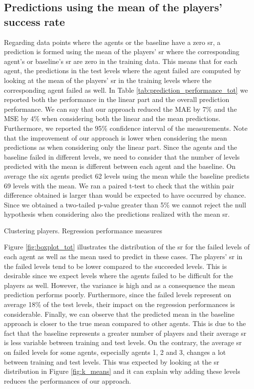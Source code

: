 \subsection*{Predictions using the mean of the players’ success rate}
Regarding data points where the agents or the baseline have a zero \acs{sr}, a prediction is formed using the mean of the players' \acs{sr} where the corresponding agent's or baseline's \acs{sr} are zero in the training data. This means that for each agent, the predictions in the test levels where the agent failed are computed by looking at the mean of the players' \acs{sr} in the training levels where the corresponding agent failed as well. In Table \ref{tab:prediction_performance_tot} we reported both the performance in the linear part and the overall prediction performance. We can say that our approach reduced the MAE by 7\% and the MSE by 4\% when considering both the linear and the mean predictions. Furthermore, we reported the 95\% confidence interval of the measurements. Note that the improvement of our approach is lower when considering the mean predictions as when considering only the linear part.
Since the agents and the baseline failed in different levels, we need to consider that the number of levels predicted with the mean is different between each agent and the baseline. On average the six agents predict 62 levels using the mean while the baseline predicts 69 levels with the mean.
We ran a paired t-test to check that the within pair difference obtained is larger than would be expected to have occurred by chance. Since we obtained a two-tailed p-value greater than 5\% we cannot reject the null hypothesis when considering also the predictions realized with the mean \acs{sr}.
\begin{table}[h!]
    \centering
    \small
    \caption{Clustering players. Regression performance measures} 
    
    \label{tab:prediction_performance_tot}
\end{table} 

Figure \ref{fig:boxplot_tot} illustrates the distribution of the \acs{sr} for the failed levels of each agent as well as the mean used to predict in these cases. The players' \acs{sr} in the failed levels tend to be lower compared to the succeeded levels. This is desirable since we expect levels where the agents failed to be difficult for the players as well. However, the variance is high and as a consequence the mean prediction performs poorly. Furthermore, since the failed levels represent on average 18\% of the test levels, their impact on the regression performances is considerable. Finally, we can observe that the predicted mean in the baseline approach is closer to the true mean compared to other agents. This is due to the fact that the baseline represents a greater number of players and their average \acs{sr} is less variable between training and test levels. On the contrary, the average \acs{sr} on failed levels for some agents, especially agents 1, 2 and 3, changes a lot between training and test levels. This was expected by looking at the \acs{sr} distribution in Figure \ref{fig:k_means} and it can explain why adding these levels reduces the performances of our approach.


